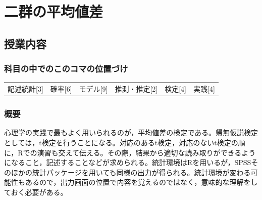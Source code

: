 \section{二群の平均値差}
\label{s20_ttest}

\subsection{授業内容}
\subsubsection{科目の中でのこのコマの位置づけ}
\begin{tabular}[t]{cccccc}
	記述統計[3] & 確率[6] & モデル[9] & 推測・推定[2] & 検定[4] & 実践[4]
\end{tabular}

\subsubsection{概要}
心理学の実践で最もよく用いられるのが，平均値差の検定である。帰無仮説検定としては，t検定を行うことになる。対応のあるt検定，対応のないt検定の順に，Rでの演習も交えて伝える。その際，結果から適切な読み取りができるようになること，記述することなどが求められる。統計環境はRを用いるが，SPSSそのほかの統計パッケージを用いても同様の出力が得られる。統計環境が変わる可能性もあるので，出力画面の位置で内容を覚えるのではなく，意味的な理解をしておく必要がある。
